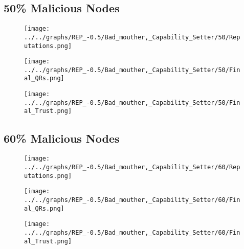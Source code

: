 \begin{minipage}[t]{0.49\columnwidth}
\subsection*{50\% Malicious Nodes}
    \begin{figure}[H]
        \centering
        \texttt{[image: ../../graphs/REP\_-0.5/Bad\_mouther,\_Capability\_Setter/50/Reputations.png]}
    \end{figure}
    \begin{figure}[H]
        \centering
        \texttt{[image: ../../graphs/REP\_-0.5/Bad\_mouther,\_Capability\_Setter/50/Final\_QRs.png]}
    \end{figure}
\end{minipage}
\begin{minipage}[t]{0.49\columnwidth}
    \begin{figure}[H]
        \centering
        \texttt{[image: ../../graphs/REP\_-0.5/Bad\_mouther,\_Capability\_Setter/50/Final\_Trust.png]}
    \end{figure}
\end{minipage}

\begin{minipage}[t]{0.49\columnwidth}
\subsection*{60\% Malicious Nodes}
    \begin{figure}[H]
        \centering
        \texttt{[image: ../../graphs/REP\_-0.5/Bad\_mouther,\_Capability\_Setter/60/Reputations.png]}
    \end{figure}
    \begin{figure}[H]
        \centering
        \texttt{[image: ../../graphs/REP\_-0.5/Bad\_mouther,\_Capability\_Setter/60/Final\_QRs.png]}
    \end{figure}
\end{minipage}
\begin{minipage}[t]{0.49\columnwidth}
    \begin{figure}[H]
        \centering
        \texttt{[image: ../../graphs/REP\_-0.5/Bad\_mouther,\_Capability\_Setter/60/Final\_Trust.png]}
    \end{figure}
\end{minipage}

